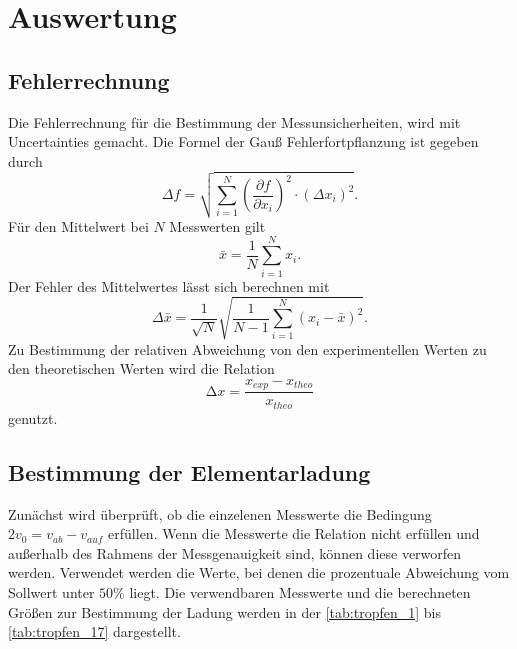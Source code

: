 \section{Auswertung}
\label{sec:auswertung}


\subsection{Fehlerrechnung}
\label{sec:Fehlerrechnung}
Die Fehlerrechnung für die Bestimmung der Messunsicherheiten, wird mit Uncertainties \cite{uncertainties} gemacht.
Die Formel der Gauß Fehlerfortpflanzung ist gegeben durch
\begin{equation}
    \Delta f=\sqrt{\sum_{i=1}^N\left(\frac{\partial f}{\partial x_i}\right)^2 \cdot\left(\Delta x_i\right)^2}.
    \label{eqn:gauss}
\end{equation}
Für den Mittelwert bei $N$ Messwerten gilt 
\begin{equation}
    \bar{x} = \frac{1}{N}\sum\limits_{i = 1}^N x_i .
    \label{eqn:mittelwert}
\end{equation}
Der Fehler des Mittelwertes lässt sich berechnen mit
\begin{equation}
    \Delta \bar{x}=\frac{1}{\sqrt{N}} \sqrt{\frac{1}{N-1} \sum_{i=1}^N\left(x_i-\bar{x}\right)^2}.
    \label{eqn:mittelwertfehler}
\end{equation}
Zu Bestimmung der relativen Abweichung von den experimentellen Werten zu den theoretischen Werten wird die
Relation 
\begin{equation}
    \increment x = \frac{x_{exp}-x_{theo}}{x_{theo}}
\end{equation} 
genutzt.

\subsection{Bestimmung der Elementarladung}
\label{bestimmung der elementarladung}

Zunächst wird überprüft, ob die einzelenen Messwerte die Bedingung $2v_0 = v_{ab}-v_{auf}$ erfüllen.
Wenn die Messwerte die Relation nicht erfüllen und außerhalb des Rahmens der Messgenauigkeit sind, können 
diese verworfen werden. Verwendet werden die Werte, bei denen die prozentuale Abweichung vom Sollwert unter
$50 \%$ liegt. Die verwendbaren Messwerte und die berechneten Größen zur Bestimmung der Ladung werden in der \autoref{tab:tropfen_1} bis \autoref{tab:tropfen_17} dargestellt.


